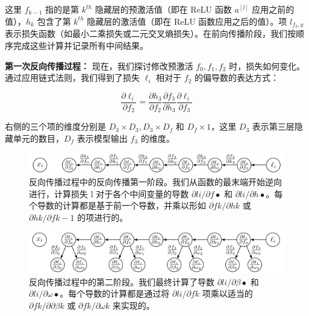 这里 \(f_{k-1}\) 指的是第 \(k^{th}\) 隐藏层的预激活值（即在 ReLU 函数 \(a^{[l]}\) 应用之前的值），\(h_k\) 包含了第 \(k^{th}\) 隐藏层的激活值（即在 ReLU 函数应用之后的值）。项 \(l_{f_3, y}\) 表示损失函数（如最小二乘损失或二元交叉熵损失）。在前向传播阶段，我们按顺序完成这些计算并记录所有中间结果。

\textbf{第一次反向传播过程：} 现在，我们探讨修改预激活 \(f_0, f_1, f_2\) 时，损失如何变化。通过应用链式法则，我们得到了损失 \(\ell_i\) 相对于 \(f_2\) 的偏导数的表达方式：

\begin{equation}
\frac{\partial \ell_i}{\partial f_2} = \frac{\partial h_3}{\partial f_2} \frac{\partial f_3}{\partial h_3} \frac{\partial \ell_i}{\partial f_3} 
\end{equation}


右侧的三个项的维度分别是 \(D_3 \times D_3, D_3 \times D_f\) 和 \(D_f \times 1\)，这里 \(D_3\) 表示第三层隐藏单元的数目，\(D_f\) 表示模型输出 \(f_3\) 的维度。

\begin{figure}[ht!]
\centering
\includegraphics[width=0.7\linewidth]{png/chapter7/Train2BP2.png}
\caption{反向传播过程中的反向传播第一阶段。我们从函数的最末端开始逆向进行，计算损失 l 对于各个中间变量的导数 \(\partial li /\partial f•\) 和 \(\partial li /\partial h•\)。每个导数的计算都是基于前一个导数，并乘以形如 \(\partial fk/\partial hk\) 或 \(\partial hk/\partial fk−1\) 的项进行的。}
\end{figure}

\begin{figure}[ht!]
\centering
\includegraphics[width=0.7\linewidth]{png/chapter7/Train2BP3.png}
\caption{反向传播过程中的第二阶段。我们最终计算了导数 \(\partial li /\partial \beta•\) 和 \(\partial li /\partial \omega•\)。每个导数的计算都是通过将 \(\partial li/\partial fk\) 项乘以适当的 \(\partial fk/\partial \partial \beta k\) 或 \(\partial fk/\partial \omega k\) 来实现的。}
\end{figure}


